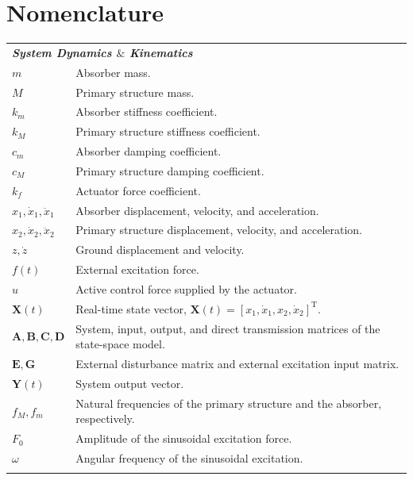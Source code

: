 \documentclass[review]{elsarticle}
\begin{document}
\section*{Nomenclature}
\begin{longtable}{@{}p{2.5cm} p{12.5cm}@{}}
\multicolumn{2}{l}{\textbf{\textit{System Dynamics $\&$ Kinematics}}} \\
$m$ & Absorber mass. \\
$M$ & Primary structure mass. \\
$k_m$ & Absorber stiffness coefficient. \\
$k_M$ & Primary structure stiffness coefficient. \\
$c_m$ & Absorber damping coefficient. \\
$c_M$ & Primary structure damping coefficient. \\
$k_f$ & Actuator force coefficient. \\
$x_1, \dot{x}_1, \ddot{x}_1$ & Absorber displacement, velocity, and acceleration. \\
$x_2, \dot{x}_2, \ddot{x}_2$ & Primary structure displacement, velocity, and acceleration. \\
$z, \dot{z}$ & Ground displacement and velocity. \\
$f(t)$ & External excitation force. \\
$u$ & Active control force supplied by the actuator. \\
$\mathbf{X}(t)$ & Real-time state vector, $\mathbf{X}(t) = [x_1, \dot{x}_1, x_2, \dot{x}_2]^{\mathrm{T}}$. \\
$\mathbf{A}, \mathbf{B}, \mathbf{C}, \mathbf{D}$ & System, input, output, and direct transmission matrices of the state-space model. \\
$\mathbf{E}, \mathbf{G}$ & External disturbance matrix and external excitation input matrix. \\
$\mathbf{Y}(t)$ & System output vector. \\
$f_M, f_m$ & Natural frequencies of the primary structure and the absorber, respectively. \\
$F_0$ & Amplitude of the sinusoidal excitation force. \\
$\omega$ & Angular frequency of the sinusoidal excitation. \\
\\


\end{longtable}
\end{document}
